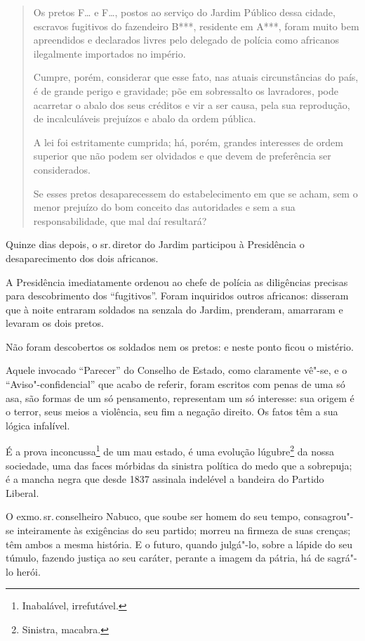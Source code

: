\begin{quote}
Os pretos F\ldots{} e F\ldots{}, postos ao serviço do Jardim Público dessa
cidade, escravos fugitivos do fazendeiro B***, residente em A***, foram
muito bem apreendidos e declarados livres pelo delegado de polícia como
africanos ilegalmente importados no império.

Cumpre, porém, considerar que esse fato, nas atuais circunstâncias do
país, é de grande perigo e gravidade; põe em sobressalto os lavradores,
pode acarretar o abalo dos seus créditos e vir a ser causa, pela sua
reprodução, de incalculáveis prejuízos e abalo da ordem pública.

A lei foi estritamente cumprida; há, porém, grandes interesses de ordem
superior que não podem ser olvidados e que devem de preferência ser
considerados.

Se esses pretos desaparecessem do estabelecimento em que se acham, sem o
menor prejuízo do bom conceito das autoridades e sem a sua
responsabilidade, que mal daí resultará?
\end{quote}

\noindent\dotfill{}

Quinze dias depois, o sr.\,diretor do Jardim participou à Presidência o
desaparecimento dos dois africanos.

A Presidência imediatamente ordenou ao chefe de polícia as diligências
precisas para descobrimento dos ``fugitivos''. Foram inquiridos outros
africanos: disseram que à noite entraram soldados na senzala do Jardim,
prenderam, amarraram e levaram os dois pretos.

Não foram descobertos os soldados nem os pretos: e neste ponto ficou o
mistério.

Aquele invocado ``Parecer'' do Conselho de Estado, como claramente vê"-se,
e o ``Aviso"-confidencial'' que acabo de referir, foram escritos com penas
de uma só asa, são formas de um só pensamento, representam um só
interesse: sua origem é o terror, seus meios a violência, seu fim a
negação direito. Os fatos têm a sua lógica infalível.

É a prova inconcussa\footnote{Inabalável, irrefutável.} de um mau
estado, é uma evolução lúgubre\footnote{Sinistra, macabra.}
da nossa sociedade, uma das
faces mórbidas da sinistra política do medo que a sobrepuja; é a mancha
negra que desde 1837 assinala indelével a bandeira do Partido Liberal.

O exmo.\,sr.\,conselheiro Nabuco, que soube ser homem do seu tempo,
consagrou"-se inteiramente às exigências do seu partido; morreu na
firmeza de suas crenças; têm ambos a mesma história. E o futuro, quando
julgá"-lo, sobre a lápide do seu túmulo, fazendo justiça ao seu caráter,
perante a imagem da pátria, há de sagrá"-lo herói.

